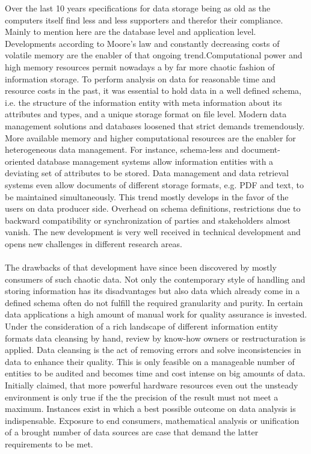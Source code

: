 Over the last 10 years specifications for data storage being as old as the computers itself find less and less supporters and therefor their compliance\cite{andlinger_2013}. Mainly to mention here are the database level and application level. Developments according to Moore's law\cite[p. 7ff, p. 87ff]{brock_2006} and constantly decreasing  costs of volatile memory are the enabler of that ongoing trend\cite{rhines_2016}.Computational power and high memory resources permit nowadays a by far more chaotic fashion of information storage. To perform analysis on data for reasonable time and resource costs in the past, it was essential to hold data in a well defined schema, i.e. the structure of the information entity with meta information about its attributes and types, and a unique storage format on file level. Modern data management solutions and databases loosened that strict demands tremendously. More available memory and higher computational resources are the enabler for heterogeneous data management. For instance, schema-less and document-oriented database management systems allow information entities with a deviating set of attributes to be stored\cite{hills_2016}. Data management and data retrieval systems even allow documents of different storage formats, e.g. PDF and text, to be maintained simultaneously. This trend mostly develops in the favor of the users on data producer side. Overhead on schema definitions, restrictions due to backward compatibility or synchronization of parties and stakeholders almost vanish. The new development is very well received in technical development and opens new challenges in different research areas.
\\\\
The drawbacks of that development have since been discovered by mostly consumers of such chaotic data\cite{lombardo_di_nitto_ardagna_2012}. Not only the contemporary style of handling and storing information has its disadvantages but also data which already come in a defined schema often do not fulfill the required granularity and purity. In certain data applications a high amount of manual work for quality assurance is invested\cite{wang_strong_1996}. Under the consideration of a rich landscape of different information entity formats data cleansing by hand, review by know-how owners or restructuration is applied. Data cleansing is the act of removing errors and solve inconsistencies in data to enhance their quality. This is only feasible on a manageable number of entities to be audited and becomes time and cost intense on big amounts of data. Initially claimed, that more powerful hardware resources even out the unsteady environment is only true if the the precision of the result must not meet a maximum. Instances exist in which a best possible outcome on data analysis is indispensable. Exposure to end consumers, mathematical analysis or unification of a brought number of data sources are case that demand the latter requirements to be met. 

